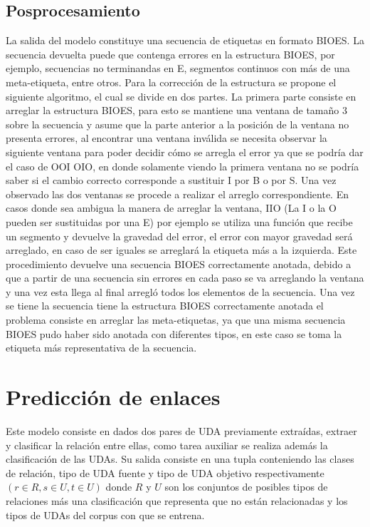 
\subsection{Posprocesamiento}

La salida del modelo constituye una secuencia de etiquetas en formato BIOES. La secuencia devuelta puede que contenga
errores en la estructura BIOES, por ejemplo, secuencias no terminandas en E, segmentos continuos con más de una meta-etiqueta,
entre otros.
Para la corrección de la estructura se propone el siguiente algoritmo, el cual se divide en dos partes. La primera
parte consiste en arreglar la estructura BIOES, para esto se mantiene una ventana de tamaño
3 sobre la secuencia y asume que la parte anterior a la posición de la ventana no presenta errores, al encontrar una
ventana inválida se necesita observar la siguiente ventana para poder decidir cómo se arregla el error ya que se
podría dar el caso de OOI OIO, en donde solamente viendo la primera ventana no se podría saber si el cambio 
correcto corresponde a sustituir I por B o por S. Una vez observado las dos ventanas se procede a realizar el 
arreglo correspondiente. En casos donde sea ambigua la manera de arreglar la ventana, IIO (La I o la O pueden ser 
sustituidas por una E) por ejemplo se utiliza una función que recibe un segmento y devuelve la gravedad del error,
el error con mayor gravedad será arreglado, en caso de ser iguales se arreglará la etiqueta más a la izquierda.
Este procedimiento devuelve una secuencia BIOES correctamente anotada, debido a que a partir de una secuencia sin 
errores en cada paso se va arreglando la ventana y una vez esta llega al final arregló todos los elementos de la secuencia.
Una vez se tiene la secuencia tiene la estructura BIOES correctamente anotada el problema
consiste en arreglar las meta-etiquetas, ya que una misma secuencia BIOES pudo haber sido anotada con diferentes
tipos, en este caso se toma la etiqueta más representativa de la secuencia.

\section{Predicción de enlaces}

Este modelo consiste en dados dos pares de UDA previamente extraídas, 
extraer y clasificar la relación entre ellas, como tarea auxiliar se realiza además la clasificación 
de las UDAs. Su salida consiste en una tupla conteniendo las clases de relación, tipo de UDA fuente y 
tipo de UDA objetivo respectivamente $(r \in R, s \in U, t \in U)$ donde $R$ y $U$ son los conjuntos de 
posibles tipos de relaciones más una clasificación que representa que no están relacionadas y los tipos de UDAs 
del corpus con que se entrena.

